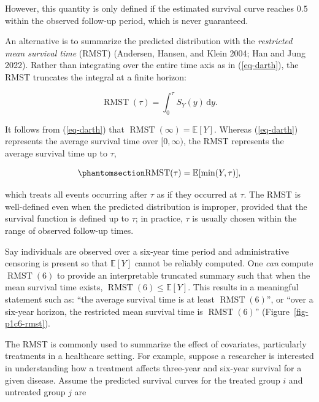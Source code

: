 \documentclass[
  letterpaper,
  krantz2]{style/krantz}
\begin{document}
However, this quantity is only defined if the estimated survival curve
reaches \(0.5\) within the observed follow-up period, which is never
guaranteed.

An alternative is to summarize the predicted distribution with the
\emph{restricted mean survival time}
(RMST) (Andersen, Hansen, and Klein
2004; Han and Jung 2022). Rather than integrating over the entire time
axis as in (\ref{eq-darth}), the RMST truncates the integral at a finite
horizon:

\[
\operatorname{RMST}(\tau) = \int^\tau_0 S_Y(y) \,\mathrm{d}y.
\]

It follows from (\ref{eq-darth}) that
\(\operatorname{RMST}(\infty) = \mathbb{E}[Y]\). Whereas
(\ref{eq-darth}) represents the average survival time over
\([0,\infty)\), the RMST represents the average survival time up to
\(\tau\),

\begin{equation}\phantomsection\label{eq-rmst-min}{
\operatorname{RMST}(\tau) = \mathbb{E}[\min(Y, \tau)],
}\end{equation}

which treats all events occurring after \(\tau\) as if they occurred at
\(\tau\). The RMST is well-defined even when the predicted distribution
is improper, provided that the survival
function is defined up to \(\tau\); in practice, \(\tau\) is usually
chosen within the range of observed follow-up times.

Say individuals are observed over a six-year time period and
administrative censoring is present so that
\(\mathbb{E}[Y]\) cannot be reliably computed. One \emph{can} compute
\(\operatorname{RMST}(6)\) to provide an interpretable truncated summary
such that when the mean survival time exists,
\(\operatorname{RMST}(6) \leq \mathbb{E}[Y]\). This results in a
meaningful statement such as: ``the average survival time is at least
\(\operatorname{RMST}(6)\)'', or ``over a six-year horizon, the
restricted mean survival time is \(\operatorname{RMST}(6)\)''
(Figure~\ref{fig-p1c6-rmst}).

The RMST is commonly used to summarize the effect of covariates,
particularly treatments in a healthcare setting. For example, suppose a
researcher is interested in understanding how a treatment affects
three-year and six-year survival for a given disease. Assume the
predicted survival curves for the treated group \(i\) and untreated
group \(j\) are
\end{document}
